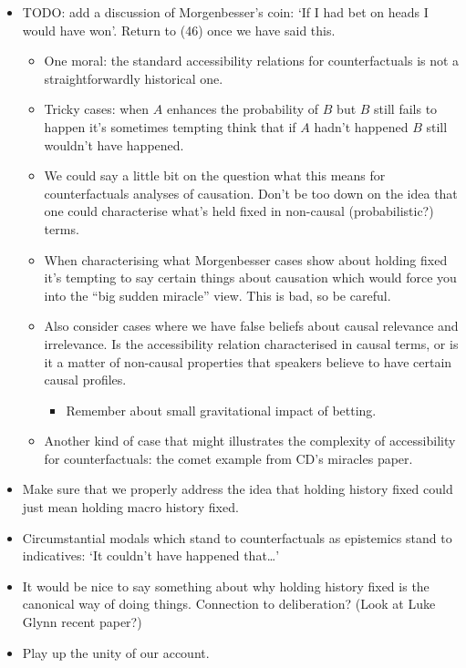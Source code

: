 \documentclass[If.tex]{subfiles}
\begin{document}
\begin{prop}
\begin{itemize}
	\item
	TODO: add a discussion of Morgenbesser's coin: ‘If I had bet on heads I would have won’. Return to (46) once we have said this.
	\begin{itemize} 
		\item
		One moral: the standard accessibility relations for counterfactuals is not a straightforwardly historical one.
		\item
		Tricky cases: when $A$ enhances the probability of $B$ but $B$ still fails to happen it's sometimes tempting think that if $A$ hadn't happened $B$ still wouldn't have happened.
		\item
		We could say a little bit on the question what this means for counterfactuals analyses of causation. Don't be too down on the idea that one could characterise what's held fixed in non-causal (probabilistic?) terms.
		\item
		When characterising what Morgenbesser cases show about holding fixed it's tempting to say certain things about causation which would force you into the “big sudden miracle” view. This is bad, so be careful.
		\item
		Also consider cases where we have false beliefs about causal relevance and irrelevance. Is the accessibility relation characterised in causal terms, or is it a matter of non-causal properties that speakers believe to have certain causal profiles.
		\begin{itemize} 
			\item
			Remember about small gravitational impact of betting.
		\end{itemize}
		\item
		Another kind of case that might illustrates the complexity of accessibility for counterfactuals: the comet example from CD's miracles paper. 
	\end{itemize}
	\item
	Make sure that we properly address the idea that holding history fixed could just mean holding macro history fixed.
	\item
	Circumstantial modals which stand to counterfactuals as epistemics stand to indicatives: ‘It couldn't have happened that\ldots{}’
	\item
	It would be nice to say something about why holding history fixed is the canonical way of doing things. Connection to deliberation? (Look at Luke Glynn recent paper?)
	\item
	Play up the unity of our account.

\end{itemize}
\end{prop}
\end{document}
